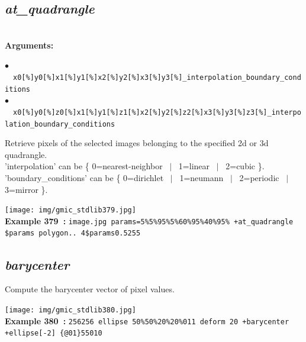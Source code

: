 \documentclass[a4paper,10.5pt,twoside]{book}
\def\comma{\discretionary{,}{}{,}}
\newcommand{\Cb}[1]{\textcolor{cb}{#1}}
\begin{document}
\subsection{\emph{at\_quadrangle} }\vspace*{-0.7em}
~\\\textbf{\Cb{Arguments: }}\begin{flushleft}
{\small \Cb{\hspace*{0.5cm}$\bullet$~~\texttt{x0[\%]{\comma}y0[\%]{\comma}x1[\%]{\comma}y1[\%]{\comma}x2[\%]{\comma}y2[\%]{\comma}x3[\%]{\comma}y3[\%]{\comma}\_interpolati\-on{\comma}\_boundary\_conditions}}}~~~\\
{\small \Cb{\hspace*{0.5cm}$\bullet$~~\texttt{x0[\%]{\comma}y0[\%]{\comma}z0[\%]{\comma}x1[\%]{\comma}y1[\%]{\comma}z1[\%]{\comma}x2[\%]{\comma}y2[\%]{\comma}z2[\%]{\comma}x3[\%]{\comma}\-y3[\%]{\comma}z3[\%]{\comma}\_interpolation{\comma}\_boundary\_conditions}}}\end{flushleft}
Retrieve pixels of the selected images belonging to the specified 2d or 3d quadrangle.
~\\'interpolation' can be \{ 0=nearest-neighbor ~$|$~ 1=linear ~$|$~ 2=cubic \}.
~\\'boundary\_conditions' can be \{ 0=dirichlet ~$|$~ 1=neumann ~$|$~ 2=periodic ~$|$~ 3=mirror \}.
\begin{center}\texttt{[image: img/gmic\_stdlib379.jpg]}\\
{\footnotesize \textbf{Example 379~:} \texttt{image.jpg params=5\%{\comma}5\%{\comma}95\%{\comma}5\%{\comma}60\%{\comma}95\%{\comma}40\%{\comma}95\% +at\_quadrangle \$params polygon.. 4{\comma}\$params{\comma}0.5{\comma}255}}
\end{center}

\subsection{\emph{barycenter} }\vspace*{-0.7em}
Compute the barycenter vector of pixel values.
\begin{center}\texttt{[image: img/gmic\_stdlib380.jpg]}\\
{\footnotesize \textbf{Example 380~:} \texttt{256{\comma}256 ellipse 50\%{\comma}50\%{\comma}20\%{\comma}20\%{\comma}0{\comma}1{\comma}1 deform 20 +barycenter +ellipse[-2] \{@0{\comma}1\}{\comma}5{\comma}5{\comma}0{\comma}10}}
\end{center}
\end{document}

